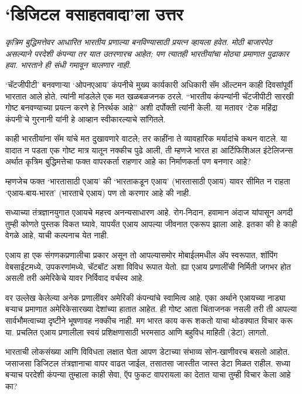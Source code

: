 \chapter{`डिजिटल वसाहतवादा'ला उत्तर }

{\textit{कृत्रिम बुद्धिमत्तेवर आधारित भारतीय प्रणाल्या बनविण्यासाठी प्रयत्न व्हायला हवेत. मोठी बाजारपेठ असल्याने परदेशी कंपन्या तर यात उतरणारच आहेत; पण त्यातही भारतीयांचा मोठ्या प्रमाणात पुढाकार हवा. भारताने ही संधी गमावून चालणार नाही.}}

\vspace{1.5em}

`चॅटजीपीटी' बनवणाऱ्या `ओपनएआय' कंपनीचे मुख्य कार्यकारी अधिकारी सॅम ऑल्टमन काही दिवसांपूर्वी भारतात आले होते. त्यांनी मांडलेले एक मत खळबळजनक ठरले. ``भारतीय कंपन्यांनी चॅटजीपीटी सारखी गोष्ट बनवण्याच्या प्रयत्न करणे हे निरर्थक आहे'' अशी दर्पोक्ती त्यांनी केली. या मतावर `टेक महिंद्रा कंपनी'चे गुरनानी यांनी हे आव्हान स्वीकारल्याचे सांगितले.

काही भारतीयांना सॅम यांचे मत दुखावणारे वाटले; तर काहींना ते व्यावहारिक मर्यादांचे कथन वाटले. या वादात न पडता एक गोष्ट मात्र यातून नक्कीच पुढे आली, ती म्हणजे भारत हा आर्टिफिशिअल इंटेलिजन्स अर्थात कृत्रिम बुद्धिमत्तेचा फक्त वापरकर्ता राहणार आहे का निर्माणकर्ता पण बनणार आहे?

म्हणजेच फक्त `भारतासाठी एआय' की `भारताकडून एआय' (भारतासाठी एआय) यावर सीमित न राहता `एआय-बाय-भारत' (भारताचे एआय) पण तो करणार आहे की नाही.

सध्याच्या तंत्रज्ञानयुगात एआयचे महत्त्व अनन्यसाधारण आहे. रोग-निदान, हवामान अंदाज यांपासून अगदी तुम्ही कोणते पुस्तक विकत घ्यावे, यापर्यंत एआय आपल्या जीवनात एकरूप झाला आहे. इतका की हे काही वेगळे आहे, याची कल्पनाच येत नाही.

एआय हा एक संगणकप्रणालीचा प्रकार असून तो आपल्यासमोर मोबाईलमधील ॲप स्वरूपात, शॉपिंग वेबसाईटमध्ये, उपकरणांमध्ये, चॅटबॉट अशा विविध रूपात येतो. ह्या एआय प्रणालींची निर्मिती जगभर होत असली तरी अमेरिकेचे यावर निर्विवाद वर्चस्व आहे.

वर उल्लेख केलेल्या अनेक प्रणालींवर अमेरिकी कंपन्यांचे स्वामित्व आहे. एका अर्थाने एआयच्या नाड्या बऱ्याच प्रमाणात अमेरिकेसारख्या देशांच्या हातात आहेत. ही गोष्ट आता चिंताजनक नसली तरी ती आपल्या सार्वभौमत्वाच्या दृष्टीने भूषणावह नक्कीच नाही. मग भारत काय करू शकतो याचा थोडक्यात विचार करू या. प्रचलित एआय प्रणालीला स्वयं प्रशिक्षणासाठी भरमसाठ आणि बहुविध माहिती (डेटा) लागतो.

भारताची लोकसंख्या आणि विविधता लक्षात घेता आपण डेटाच्या संभाव्य सोन-खाणीवरच बसलो आहोत. जसाजसा डिजिटल तंत्रज्ञानाचा वापर वाढत जाईल, तसातसा जास्तीत जास्त डेटा मिळत राहील. सध्या बऱ्याच परदेशी कंपन्या तुम्हाला काही सेवा, ऍप फुकट वापरायला का देतात याचा तुम्ही विचार केला आहे का?


